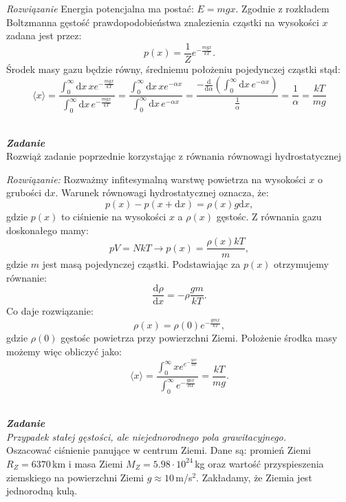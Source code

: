 \documentclass[11pt,a4paper]{article}
\newcounter{zadanie}\newcommand{\zadanie}[1][]{\addtocounter{zadanie}{1} ~\\  {\bf \emph{Zadanie \arabic{zadanie} #1 }} \\}
\renewcommand{\t}[1]{\textrm{#1}}
\begin{document}
\emph{Rozwiązanie}
Energia potencjalna ma postać: $E = m g x$. Zgodnie z rozkładem Boltzmanna gęstość prawdopodobieństwa znalezienia cząstki na wysokości $x$
zadana jest przez:
$$
p(x) = \frac{1}{Z} e^{-\frac{mgx}{kT}}.
$$
Środek masy gazu będzie równy, średniemu położeniu pojedynczej cząstki stąd:
$$
\langle x \rangle =  \frac{\int_0^\infty \t{d} x\, x e^{-\frac{m g x}{k T }}}{\int_0^\infty \t{d} x\, e^{-\frac{m g x}{k T }}} =
\frac{\int_0^\infty \t{d} x\, x e^{- \alpha x }}{\int_0^\infty \t{d} x\, e^{-\alpha x}} = \frac{- \frac{\t{d}}{\t{d}\alpha}
\left( \int_0^\infty \t{d} x\, e^{- \alpha x }\right)}{\frac{1}{\alpha}} = \frac{1}{\alpha} = \frac{k T }{m g}
$$

\newpage

\zadanie
Rozwiąż zadanie poprzednie korzystając z równania równowagi hydrostatycznej
\newline

\emph{Rozwiązanie:}
Rozważmy infitesymalną warstwę powietrza na wysokości $x$ o grubości $\t{d}x$. Warunek równowagi hydrostatycznej oznacza, że:
$$
p(x) - p(x+\t{d}x) = \rho(x) g \t{d} x,
$$
gdzie $p(x)$ to ciśnienie na wysokości $x$ a $\rho(x)$ gęstośc. Z równania gazu doskonałego mamy:
$$
p V = N k T \longrightarrow p(x) = \frac{\rho(x) k T }{m},
$$
gdzie $m$ jest masą pojedynczej cząstki. Podstawiając za $p(x)$ otrzymujemy równanie:
$$
\frac{\t{d}\rho}{\t{d}x} = - \rho \frac{g m}{k T}.
$$
Co daje rozwiązanie:
$$
\rho(x) = \rho(0) e^{- \frac{g m x}{k T}},
$$
gdzie $\rho(0)$ gęstośc powietrza przy powierzchni Ziemi.
Położenie środka masy możemy więc obliczyć jako:
$$
\langle x \rangle = \frac{\int_0^\infty x e^{e^{- \frac{g \mu x}{R T}}}}{\int_0^\infty  {e^{- \frac{g \mu x}{R T}}}} = \frac{k T}{m g}.
$$

\newpage

\zadanie
{\em Przypadek stałej gęstości, ale niejednorodnego pola grawitacyjnego.} \\
Oszacować ciśnienie panujące w centrum Ziemi.
Dane są: promień Ziemi $R_Z = 6370$\,km i masa Ziemi \linebreak \mbox{$M_Z = 5.98\cdot10^{24}$\,kg} oraz wartość
przyspieszenia ziemskiego na powierzchni Ziemi $g\approx 10$\,m/s$^2$.
Zakładamy, że Ziemia jest jednorodną kulą.
\newline
\end{document}
